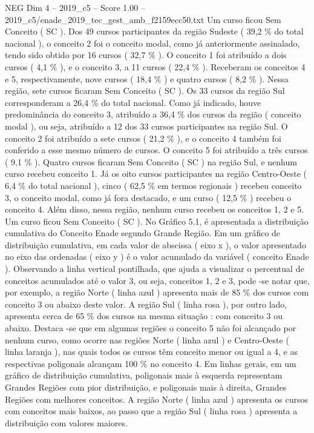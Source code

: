 \begin{textsample}{NEG Dim 4 – 2019\_c5 – Score 1.00 – 2019\_c5/enade\_2019\_tec\_gest\_amb\_f2159ecc50.txt}
Um curso ficou Sem Conceito ( SC ).
Dos 49 cursos participantes da região Sudeste ( 39,2 \% do total nacional ), o conceito 2 foi o conceito modal, como já anteriormente assinalado, tendo sido obtido por 16 cursos ( 32,7 \% ).
O conceito 1 foi atribuído a dois cursos ( 4,1 \% ), e o conceito 3, a 11 cursos ( 22,4 \% ).
Receberam os conceitos 4 e 5, respectivamente, nove cursos ( 18,4 \% ) e quatro cursos ( 8,2 \% ).
Nessa região, sete cursos ficaram Sem Conceito ( SC ).
Os 33 cursos da região Sul corresponderam a 26,4 \% do total nacional.
Como já indicado, houve predominância do conceito 3, atribuído a 36,4 \% dos cursos da região ( conceito modal ), ou seja, atribuído a 12 dos 33 cursos participantes na região Sul.
O conceito 2 foi atribuído a sete cursos ( 21,2 \% ), e o conceito 4 também foi conferido a esse mesmo número de cursos.
O conceito 5 foi atribuído a três cursos ( 9,1 \% ).
Quatro cursos ficaram Sem Conceito ( SC ) na região Sul, e nenhum curso recebeu conceito 1.
Já os oito cursos participantes na região Centro-Oeste ( 6,4 \% do total nacional ), cinco ( 62,5 \% em termos regionais ) recebeu conceito 3, o conceito modal, como já fora destacado, e um curso ( 12,5 \% ) recebeu o conceito 4.
Além disso, nessa região, nenhum curso recebeu os conceitos 1, 2 e 5.
Um curso ficou Sem Conceito ( SC ).
No Gráfico 5.1, é apresentada a distribuição cumulativa do Conceito Enade segundo Grande Região.
Em um gráfico de distribuição cumulativa, em cada valor de abscissa ( eixo x ), o valor apresentado no eixo das ordenadas ( eixo y ) é o valor acumulado da variável ( conceito Enade ).
Observando a linha vertical pontilhada, que ajuda a visualizar o percentual de conceitos acumulados até o valor 3, ou seja, conceitos 1, 2 e 3, pode -se notar que, por exemplo, a região Norte ( linha azul ) apresenta mais de 85 \% dos cursos com conceito 3 ou abaixo deste valor.
A região Sul ( linha rosa ), por outro lado, apresenta cerca de 65 \% dos cursos na mesma situação : com conceito 3 ou abaixo.
Destaca -se que em algumas regiões o conceito 5 não foi alcançado por nenhum curso, como ocorre nas regiões Norte ( linha azul ) e Centro-Oeste ( linha laranja ), nas quais todos os cursos têm conceito menor ou igual a 4, e as respectivas poligonais alcançam 100 \% no conceito 4.
Em linhas gerais, em um gráfico de distribuição cumulativa, poligonais mais à esquerda representam Grandes Regiões com pior distribuição, e poligonais mais à direita, Grandes Regiões com melhores conceitos.
A região Norte ( linha azul ) apresenta os cursos com conceitos mais baixos, ao passo que a região Sul ( linha rosa ) apresenta a distribuição com valores maiores.

\end{textsample}
